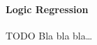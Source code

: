 \paragraph{Logic Regression}
\label{par:methods.flat.embedded.logic_regression}

  
TODO
Bla bla bla\ldots